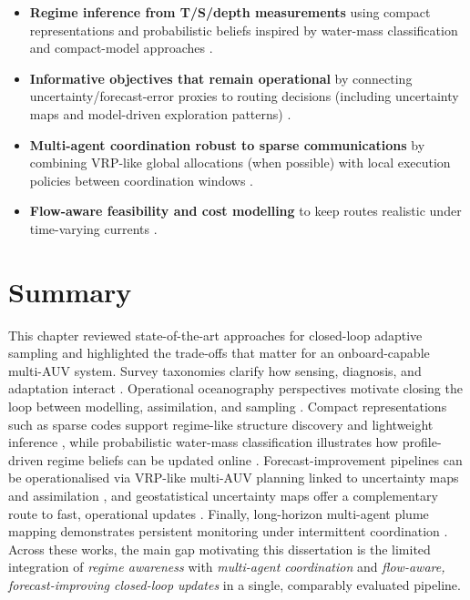 \begin{itemize}
  \item \textbf{Regime inference from T/S/depth measurements} using compact representations and probabilistic beliefs inspired by water-mass classification and compact-model approaches \parencite{ge2023watermasses,fossum2020compact}.

  \item \textbf{Informative objectives that remain operational} by connecting uncertainty/forecast-error proxies to routing decisions (including uncertainty maps and model-driven exploration patterns) \parencite{bernacchi2025closingloop,duarte2025geostatistical,mendes2025oceanmodeldriven}.

  \item \textbf{Multi-agent coordination robust to sparse communications} by combining VRP-like global allocations (when possible) with local execution policies between coordination windows \parencite{bernacchi2025closingloop,dalfabbro2025douroplume,skaugset2025autonomousorg}.

  \item \textbf{Flow-aware feasibility and cost modelling} to keep routes realistic under time-varying currents \parencite{aguiar2018trajectoryopt}.
\end{itemize}

\section{Summary} \label{sec:ch3_summary}

This chapter reviewed state-of-the-art approaches for closed-loop adaptive sampling and highlighted the trade-offs that matter for an onboard-capable multi-AUV system.
Survey taxonomies clarify how sensing, diagnosis, and adaptation interact \parencite{hwang2019auvreview}.
Operational oceanography perspectives motivate closing the loop between modelling, assimilation, and sampling \parencite{lermusiaux2007adaptive,curtin2009aosn}.
Compact representations such as sparse codes support regime-like structure discovery and lightweight inference \parencite{fossum2020compact}, while probabilistic water-mass classification illustrates how profile-driven regime beliefs can be updated online \parencite{ge2023watermasses}.
Forecast-improvement pipelines can be operationalised via VRP-like multi-AUV planning linked to uncertainty maps and assimilation \parencite{bernacchi2025closingloop,mendes2025oceanmodeldriven}, and geostatistical uncertainty maps offer a complementary route to fast, operational updates \parencite{duarte2025geostatistical}.
Finally, long-horizon multi-agent plume mapping demonstrates persistent monitoring under intermittent coordination \parencite{dalfabbro2025douroplume}.
Across these works, the main gap motivating this dissertation is the limited integration of \emph{regime awareness} with \emph{multi-agent coordination} and \emph{flow-aware, forecast-improving closed-loop updates} in a single, comparably evaluated pipeline.
